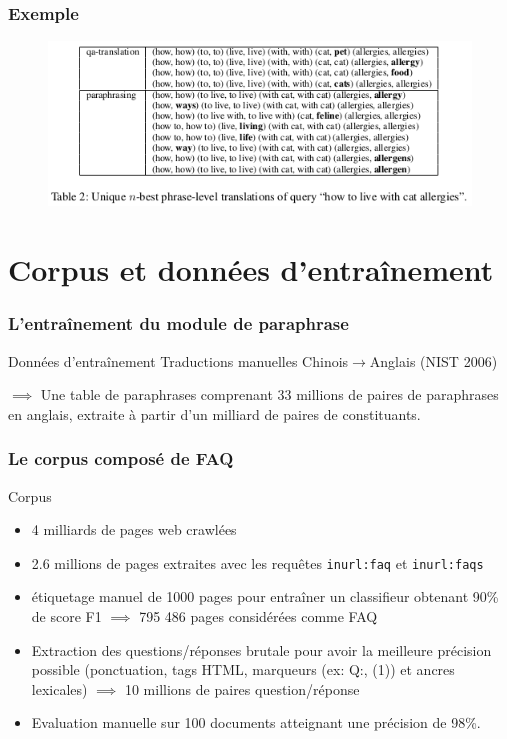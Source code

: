 \documentclass[10pt]{beamer}
\begin{document}
\begin{frame}
  \frametitle{Exemple}
  \begin{figure}[h]
    \centering
    \includegraphics[width=\textwidth]{table2}
    \label{fig:res}
  \end{figure}
\end{frame}

\section{Corpus et données d'entraînement}
\label{sec:corpus}

\begin{frame}
  \frametitle{L'entraînement du module de paraphrase}
  \begin{block}{Données d'entra\^inement}
    Traductions manuelles Chinois$\rightarrow$Anglais (NIST 2006)
    
    $\implies$ Une table de paraphrases comprenant 33 millions de paires de paraphrases en anglais, extraite à partir d'un milliard de paires de constituants.
  \end{block}
\end{frame}

\begin{frame}
  \frametitle{Le corpus composé de FAQ}
  \begin{block}{Corpus}
  \begin{itemize}
    \item 4 milliards de pages web crawlées
    \item 2.6 millions de pages extraites avec les requ\^etes \og \verb?inurl:faq? \fg{} et \og \verb?inurl:faqs? \fg{} 
  	\item étiquetage manuel de 1000 pages pour entraîner un classifieur obtenant 90\% de score F1 $\implies$ 795 486 pages considérées comme FAQ
  	\item Extraction des questions/réponses brutale pour avoir la meilleure précision possible (ponctuation, tags HTML, marqueurs (ex: Q:, (1)) et ancres lexicales) $\implies$ 10 millions de paires question/réponse
  	\item Evaluation manuelle sur 100 documents atteignant une précision de 98\%.
  \end{itemize}
  \end{block}
\end{frame}
\end{document}
